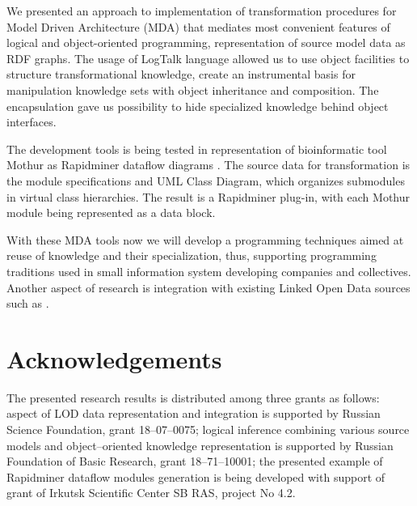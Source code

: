 \documentclass[conference]{IEEEtran}
\begin{document}

We presented an approach to implementation of transformation procedures for Model Driven Architecture (MDA) that mediates most convenient features of logical and object-oriented programming, representation of source model data as RDF graphs.  The usage of LogTalk language allowed us to use object facilities to structure transformational knowledge, create an instrumental basis for manipulation knowledge sets with object inheritance and composition.  The encapsulation gave us possibility to hide specialized knowledge behind object interfaces.

The development tools is being tested in representation of bioinformatic tool Mothur as Rapidminer dataflow diagrams \cite{bit2019}.  The source data for transformation is the module specifications and UML Class Diagram, which organizes submodules in virtual class hierarchies.  The result is a Rapidminer plug-in, with each Mothur module being represented as a data block.

With these MDA tools now we will develop a programming techniques aimed at reuse of knowledge and their specialization, thus, supporting programming traditions used in small information system developing companies and collectives.  Another aspect of research is integration with existing Linked Open Data sources such as \cite{digarch}.

\section{Acknowledgements}
\label{sec:ack-descr}

The presented research results is distributed among three grants as follows: aspect of LOD data representation and integration is supported by Russian Science Foundation, grant 18--07--0075; logical inference combining various source models and object--oriented knowledge representation is supported by Russian Foundation of Basic Research, grant 18--71--10001; the presented example of Rapidminer dataflow modules generation is being developed with support of grant of Irkutsk Scientific Center SB RAS, project No 4.2.
\end{document}
